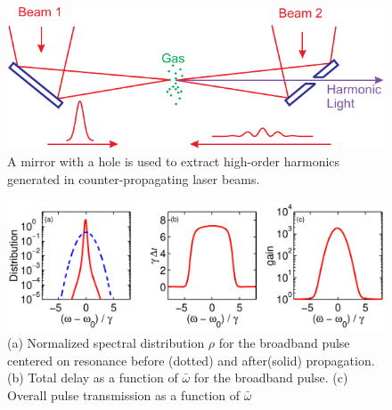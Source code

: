 \begin{figure}
    \centerline{\includegraphics{Graphic1}}
    \caption[Setup for using counter-propagating light]{\label{fig:MirrorDiagram} A mirror with a hole is used to extract high-order harmonics generated in
    counter-propagating laser beams.}
\end{figure}

\begin{figure}
\centerline{\includegraphics[width=5.5in]{figure3}} \caption[Group
delay for broadband pulses]{\label{fig:DelayPlot} (a) Normalized
spectral distribution $\rho$ for the broadband pulse centered on
resonance before (dotted) and after(solid) propagation. (b) Total
delay as a function of $\bar{\omega}$ for the broadband pulse. (c)
Overall pulse transmission as a function of $\bar{\omega}$}
\end{figure}

